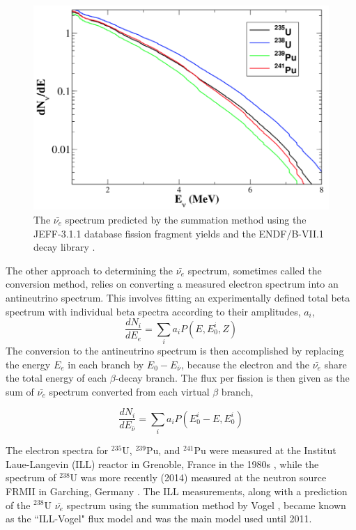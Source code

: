 \begin{figure}[t]
	\centering
	\includegraphics[width=0.65\linewidth]{tex/3-reactorneutrinos-images/Spectrum}
	\caption{The $\bar{\nu_e}$ spectrum predicted by the summation method using the JEFF-3.1.1 database fission fragment yields and the ENDF/B-VII.1 decay library \cite{HayesVogel}.}
	\label{fig:spectrum}
\end{figure}

The other approach to determining the $\bar{\nu_{e}}$ spectrum, sometimes called the conversion method, relies on converting a measured electron spectrum into an antineutrino spectrum. 
This involves fitting an experimentally defined total beta spectrum with individual beta spectra according to their amplitudes, $a_i$, 
\begin{equation}
	\frac{dN_i}{dE_e} = \sum_{i}a_iP(E,E^i_0,Z)
\end{equation}
The conversion to the antineutrino spectrum is then accomplished by replacing the energy $E_e$ in each branch by $E_0 - E_{\bar{\nu}}$, because the electron and the $\bar{\nu_e}$ share the total energy of each $\beta$-decay branch.
The flux per fission is then given as the sum of $\bar{\nu_e}$ spectrum converted from each virtual $\beta$ branch,

\begin{equation}
	\frac{dN_i}{dE_{\bar{\nu}}} = \sum_{i}a_iP(E^i_0-E,E^i_0)
\end{equation}


The electron spectra for $^{235}$U, $^{239}$Pu, and $^{241}$Pu were measured at the Institut
Laue-Langevin (ILL) reactor in Grenoble, France in the 1980s \cite{VonFeilitzsch:1982jw,Schreckenbach:1985ep,Hahn:1989zr}, while the spectrum of $^{238}$U was more recently (2014) measured at the neutron source FRMII in Garching, Germany \cite{Haag:2013raa}.
The ILL measurements, along with a prediction of the $^{238}$U $\bar{\nu_{e}}$ spectrum using the summation method by Vogel \cite{PhysRevC.24.1543}, became known as the ``ILL-Vogel" flux model and was the main model used until 2011.

